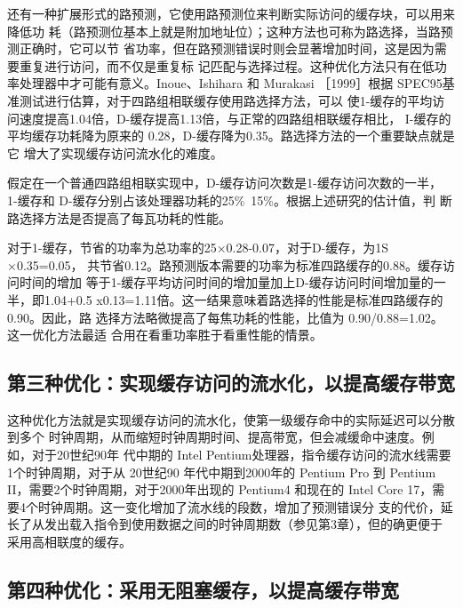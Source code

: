 还有一种扩展形式的路预测，它使用路预测位来判断实际访问的缓存块，可以用来降低功
耗（路预测位基本上就是附加地址位）；这种方法也可称为路选择，当路预测正确时，它可以节
省功率，但在路预测错误时则会显著增加时间，这是因为需要重复进行访问，而不仅是重复标
记匹配与选择过程。这种优化方法只有在低功率处理器中才可能有意义。Inoue、Ishihara 和
Murakasi ［1999］根据 SPEC95基准测试进行估算，对于四路组相联缓存使用路选择方法，可以
使1-缓存的平均访问速度提高1.04倍，D-缓存提高1.13倍，与正常的四路组相联缓存相比，
I-缓存的平均缓存功耗降为原来的 0.28，D-缓存降为0.35。路选择方法的一个重要缺点就是它
增大了实现缓存访问流水化的难度。

\begin{exercise}
    假定在一个普通四路组相联实现中，D-缓存访问次数是1-缓存访问次数的一半，
    1-缓存和 D-缓存分别占该处理器功耗的25\%~15\%。根据上述研究的估计值，判
    断路选择方法是否提高了每瓦功耗的性能。
\end{exercise}

\begin{solution}
    对于1-缓存，节省的功率为总功率的25×0.28-0.07，对于D-缓存，为1S ×0.35=0.05，
    共节省0.12。路预测版本需要的功率为标准四路缓存的0.88。缓存访问时间的增加
    等于1-缓存平均访问时间的增加量加上D-缓存访问时间增加量的一半，即1.04+0.5
    x0.13=1.11倍。这一结果意味着路选择的性能是标准四路缓存的0.90。因此，路
    选择方法略微提高了每焦功耗的性能，比值为 0.90/0.88=1.02。这一优化方法最适
    合用在看重功率胜于看重性能的情景。
\end{solution}

\subsection{第三种优化：实现缓存访问的流水化，以提高缓存带宽}

这种优化方法就是实现缓存访问的流水化，使第一级缓存命中的实际延迟可以分散到多个
时钟周期，从而缩短时钟周期时间、提高带宽，但会减缓命中速度。例如，对于20世纪90年
代中期的 Intel Pentium处理器，指令缓存访问的流水线需要1个时钟周期，对于从 20世纪90
年代中期到2000年的 Pentium Pro 到 Pentium II，需要2个时钟周期，对于2000年出现的 Pentium4
和现在的 Intel Core 17，需要4个时钟周期。这一变化增加了流水线的段数，增加了预测错误分
支的代价，延长了从发出载入指令到使用数据之间的时钟周期数（参见第3章），但的确更便于
采用高相联度的缓存。

\subsection{第四种优化：采用无阻塞缓存，以提高缓存带宽}

